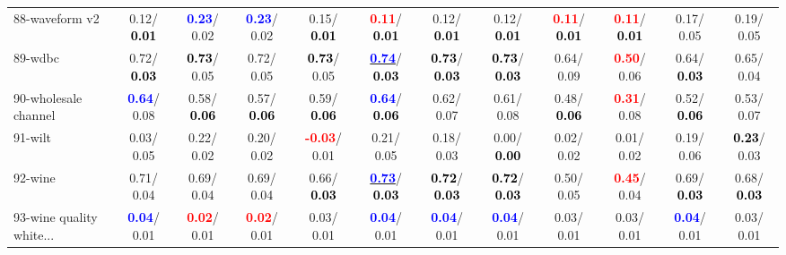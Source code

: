 \begin{table}[h]
\begin{center}
{\begin{tabular}{lc|c|c|c|c|c|c|c|c|c|c}
88-waveform v2 &   0.12/\textcolor{black}{\textbf{  0.01}} & \textcolor{blue}{\textbf{  0.23}}/  0.02 & \textcolor{blue}{\textbf{  0.23}}/  0.02 &   0.15/\textcolor{black}{\textbf{  0.01}} & \textcolor{red}{\textbf{  0.11}}/\textcolor{black}{\textbf{  0.01}} &   0.12/\textcolor{black}{\textbf{  0.01}} &   0.12/\textcolor{black}{\textbf{  0.01}} & \textcolor{red}{\textbf{  0.11}}/\textcolor{black}{\textbf{  0.01}} & \textcolor{red}{\textbf{  0.11}}/\textcolor{black}{\textbf{  0.01}} &   0.17/  0.05 &   0.19/  0.05 \\
89-wdbc &   0.72/\textcolor{black}{\textbf{  0.03}} & \textcolor{black}{\textbf{  0.73}}/  0.05 &   0.72/  0.05 & \textcolor{black}{\textbf{  0.73}}/  0.05 & \underline{\textcolor{blue}{\textbf{  0.74}}}/\textcolor{black}{\textbf{  0.03}} & \textcolor{black}{\textbf{  0.73}}/\textcolor{black}{\textbf{  0.03}} & \textcolor{black}{\textbf{  0.73}}/\textcolor{black}{\textbf{  0.03}} &   0.64/  0.09 & \textcolor{red}{\textbf{  0.50}}/  0.06 &   0.64/\textcolor{black}{\textbf{  0.03}} &   0.65/  0.04 \\
90-wholesale channel & \textcolor{blue}{\textbf{  0.64}}/  0.08 &   0.58/\textcolor{black}{\textbf{  0.06}} &   0.57/\textcolor{black}{\textbf{  0.06}} &   0.59/\textcolor{black}{\textbf{  0.06}} & \textcolor{blue}{\textbf{  0.64}}/\textcolor{black}{\textbf{  0.06}} &   0.62/  0.07 &   0.61/  0.08 &   0.48/\textcolor{black}{\textbf{  0.06}} & \textcolor{red}{\textbf{  0.31}}/  0.08 &   0.52/\textcolor{black}{\textbf{  0.06}} &   0.53/  0.07 \\
91-wilt &   0.03/  0.05 &   0.22/  0.02 &   0.20/  0.02 & \textcolor{red}{\textbf{ -0.03}}/  0.01 &   0.21/  0.05 &   0.18/  0.03 &   0.00/\textcolor{black}{\textbf{  0.00}} &   0.02/  0.02 &   0.01/  0.02 &   0.19/  0.06 & \textcolor{black}{\textbf{  0.23}}/  0.03 \\
92-wine &   0.71/  0.04 &   0.69/  0.04 &   0.69/  0.04 &   0.66/\textcolor{black}{\textbf{  0.03}} & \underline{\textcolor{blue}{\textbf{  0.73}}}/\textcolor{black}{\textbf{  0.03}} & \textcolor{black}{\textbf{  0.72}}/\textcolor{black}{\textbf{  0.03}} & \textcolor{black}{\textbf{  0.72}}/\textcolor{black}{\textbf{  0.03}} &   0.50/  0.05 & \textcolor{red}{\textbf{  0.45}}/  0.04 &   0.69/\textcolor{black}{\textbf{  0.03}} &   0.68/\textcolor{black}{\textbf{  0.03}} \\ \hline
93-wine quality white... & \textcolor{blue}{\textbf{  0.04}}/  0.01 & \textcolor{red}{\textbf{  0.02}}/  0.01 & \textcolor{red}{\textbf{  0.02}}/  0.01 &   0.03/  0.01 & \textcolor{blue}{\textbf{  0.04}}/  0.01 & \textcolor{blue}{\textbf{  0.04}}/  0.01 & \textcolor{blue}{\textbf{  0.04}}/  0.01 &   0.03/  0.01 &   0.03/  0.01 & \textcolor{blue}{\textbf{  0.04}}/  0.01 &   0.03/  0.01 \\

\end{tabular}}
\end{center}
\end{table}
